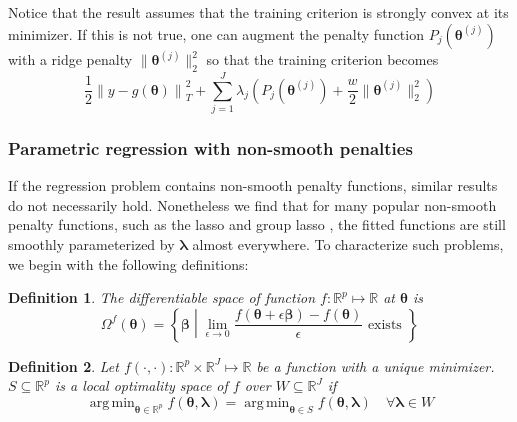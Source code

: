 \documentclass[12pt]{article}
\newtheorem{definition}{Definition}
\DeclareMathOperator*{\argmin}{arg\,min}
\begin{document}
Notice that the result assumes that the training criterion is strongly convex at its minimizer. If this is not true, one can augment the penalty function $P_j(\boldsymbol{\theta}^{(j)})$ with a ridge penalty $\| \boldsymbol{\theta}^{(j)} \|_2^2$ so that the training criterion becomes
\begin{equation}
\label{eq:param_add_models_ridge}
\frac{1}{2} \left  \| y -  g(\boldsymbol{\theta}) \right \|^2_T 
+ \sum_{j=1}^J \lambda_j \left ( P_j(\boldsymbol{\theta}^{(j)}) + \frac{w}{2} \| \boldsymbol{\theta}^{(j)} \|^2_2 \right )
\end{equation}

\subsubsection{Parametric regression with non-smooth penalties}
\label{sec:param_nonsmooth}

If the regression problem contains non-smooth penalty functions, similar results do not necessarily hold. Nonetheless we find that for many popular non-smooth penalty functions, such as the lasso \citep{tibshirani1996regression} and group lasso \citep{yuan2006model}, the fitted functions are still smoothly parameterized by $\boldsymbol \lambda$ almost everywhere. To characterize such problems, we begin with the following definitions:

\begin{definition}
	The differentiable space of function $f:\mathbb{R}^p \mapsto \mathbb{R}$ at $\boldsymbol{\theta}$ is
	\begin{equation}
	\Omega^{f}(\boldsymbol{\theta}) = \left \{ \boldsymbol{\beta} \middle | \lim_{\epsilon \rightarrow 0} \frac{f(\boldsymbol{\theta} + \epsilon \boldsymbol{\beta}) - f(\boldsymbol{\theta})}{\epsilon} \text{ exists } \right \}
	\end{equation}
\end{definition}

\begin{definition}
	Let $f(\cdot, \cdot): \mathbb{R}^p \times \mathbb{R}^J \mapsto \mathbb{R}$ be a function with a unique minimizer.
	$S \subseteq \mathbb{R}^p$ is a local optimality space of $f$ over $W \subseteq \mathbb{R}^J$ if
	\begin{equation}
	\argmin_{\boldsymbol{\theta} \in \mathbb{R}^p} f(\boldsymbol{\theta}, \boldsymbol \lambda) =
	\argmin_{\boldsymbol{\theta} \in S} f(\boldsymbol{\theta}, \boldsymbol \lambda) \quad \forall \boldsymbol \lambda \in W
	\end{equation}
\end{definition}
\end{document}
